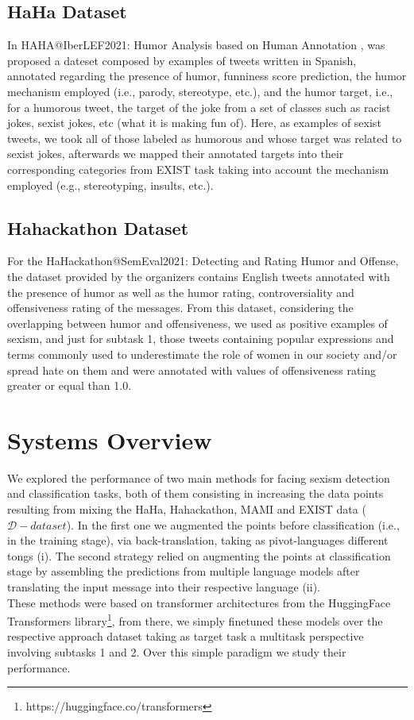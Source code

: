 \documentclass[
]{ceurart}
\begin{document}
\subsection{HaHa Dataset}

In HAHA@IberLEF2021: Humor Analysis based on Human Annotation \cite{PLN6394}, was proposed a dateset composed by examples of tweets written in Spanish, annotated regarding the presence of humor, funniness score prediction, the humor mechanism employed (i.e., parody, stereotype, etc.), and the humor target, i.e.,  for a humorous tweet, the target of the joke from a set of classes such as racist jokes, sexist jokes, etc  (what it is making fun of). 
Here, as examples of sexist tweets, we took all of those labeled as humorous and whose target was related to sexist jokes, afterwards we mapped their annotated targets into their corresponding categories from EXIST task taking into account the mechanism employed (e.g., stereotyping, insults, etc.).

\subsection{Hahackathon Dataset}
	
	For the HaHackathon@SemEval2021: Detecting and Rating Humor and Offense, the dataset provided by the organizers contains English tweets annotated with the presence of humor as well as the humor rating, controversiality and offensiveness rating of the messages. From this dataset, considering the overlapping between humor and offensiveness, we used as positive examples of sexism, and just for subtask 1, those tweets containing popular expressions and terms commonly used to underestimate the role of women in our society and/or spread hate on them and were annotated with values of offensiveness rating greater or equal than 1.0.
	
	
\section{Systems Overview} \label{ovv}

	We explored the performance of two main methods for facing sexism detection and classification tasks, both of them consisting in increasing the data points resulting from mixing the HaHa, Hahackathon, MAMI and EXIST data ($\mathcal{D}-dataset$).  In the first one we augmented the points	before classification (i.e., in the training stage), via back-translation, taking as pivot-languages different tongs (i). The second strategy relied on augmenting the points at classification stage by assembling the predictions from multiple language models after translating the input message into their respective language (ii).
	\\
	These methods were based on transformer architectures from the HuggingFace Transformers library\footnote{https://huggingface.co/transformers}, from there, we simply finetuned these models over the respective approach dataset taking as target task a multitask perspective involving subtasks 1 and 2. Over this simple paradigm we study their performance.
	
\end{document}
